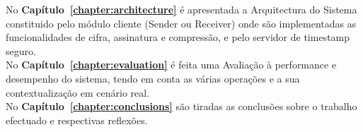 No \textbf{Capítulo~\ref{chapter:architecture}} é apresentada  a Arquitectura do Sistema constituido pelo módulo cliente (Sender ou Receiver) onde são implementadas as funcionalidades de cifra, assinatura e compressão, e pelo servidor de timestamp seguro.\\
No \textbf{Capítulo~\ref{chapter:evaluation}} é feita uma Avaliação à performance e desempenho do sistema, tendo em conta as várias operações e a sua contextualização em cenário real. \\
No \textbf{Capítulo~\ref{chapter:conclusions}} são tiradas as conclusões sobre o trabalho efectuado e respectivas reflexões.
\newpage




